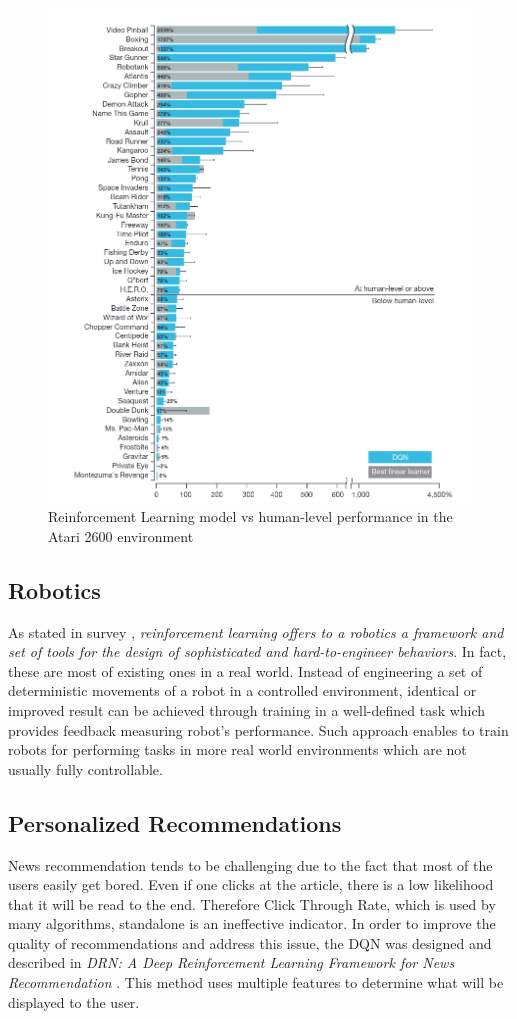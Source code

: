 \begin{figure}[h]
    \includegraphics[width=12cm]{img/Atari2600.png}
    \centering
    \caption{Reinforcement Learning model vs human-level performance in the Atari 2600 environment \cite{DQNAtari}}
    \label{fig:Atari2600}
\end{figure}

\subsection{Robotics}
\label{sub:intro-robotics}
As stated in survey \cite{RNSurvey}, \emph{reinforcement learning offers to a robotics a framework and set of tools for the design of sophisticated and hard-to-engineer behaviors}. In fact, these are most of existing ones in a real world. Instead of engineering a set of deterministic movements of a robot in a controlled environment, identical or improved result can be achieved through training in a well-defined task which provides feedback measuring robot's performance. Such approach enables to train robots for performing tasks in more real world environments which are not usually fully controllable. 

\subsection{Personalized Recommendations}
\label{sub:intro-personalized-reccomendations}
News recommendation tends to be challenging due to the fact that most of the users easily get bored. Even if one clicks at the article, there is a low likelihood that it will be read to the end. Therefore Click Through Rate, which is used by many algorithms, standalone is an ineffective indicator. In order to improve the quality of recommendations and address this issue, the DQN was designed and described in \emph{DRN: A Deep Reinforcement Learning Framework for News Recommendation} \cite{DRNNewsRecommendaiton}. This method uses multiple features to determine what will be displayed to the user.
